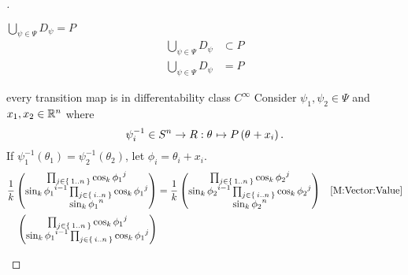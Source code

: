 \documentclass[stu, babel, american, biblatex, a4paper, leqno, draftall]{apa7}
\begin{document}
\begin{proof}[]
\begin{subproof}{$\bigcup_{\psi\in\Psi} D_\psi = P$}
\begin{align*}
            \bigcup_{\psi\in\Psi}D_\psi  & \subset P                                                                  \\
            \bigcup_{\psi\in\Psi} D_\psi & = P
        \end{align*}
    \end{subproof}
    \begin{subproof}{every transition map is in differentability class $C^\infty$}
        Consider $\psi_1, \psi_2 \in \Psi$ and $x_1, x_2 \in \mathbb{R}^n$ where
        \begin{equation*}
            \psi_i^{-1}
            \in S^n \to R
            :\tensor{\theta}{}\mapsto P\left(\tensor{\theta}{}+x_i\right)
            \text{.}
        \end{equation*}
        If $\psi_1^{-1}\left(\theta_1\right)=\psi_2^{-1}\left(\theta_2\right)$,
        let $\phi_i = \theta_i+x_i$.
        \begin{align*}
            \frac{1}{k}
            \begin{pmatrix}
                \prod_{j\in\Set{1..n}}{\cos_k{\tensor{{\phi_1}}{^j}}}                                  \\
                \sin_k{\tensor{{\phi_1}}{^{i-1}}}\prod_{j\in\Set{i..n}}{\cos_k{\tensor{{\phi_1}}{^j}}} \\
                \sin_k{{\tensor{{\phi_1}}{^n}}}                                                        \\
            \end{pmatrix}
                                                                                                                      & =
            \frac{1}{k}
            \begin{pmatrix}
                \prod_{j\in\Set{1..n}}{\cos_k{\tensor{{\phi_2}}{^j}}}                                  \\
                \sin_k{\tensor{{\phi_2}}{^{i-1}}}\prod_{j\in\Set{i..n}}{\cos_k{\tensor{{\phi_2}}{^j}}} \\
                \sin_k{{\tensor{{\phi_2}}{^n}}}                                                        \\
            \end{pmatrix} & \text{\cref{M:Vector:Value}}        \\
            \begin{pmatrix}
                \prod_{j\in\Set{1..n}}{\cos_k{\tensor{{\phi_1}}{^j}}}                                  \\
                \sin_k{\tensor{{\phi_1}}{^{i-1}}}\prod_{j\in\Set{i..n}}{\cos_k{\tensor{{\phi_1}}{^j}}} \\

\end{pmatrix}
\end{align*}
\end{subproof}
\end{proof}
\end{document}
